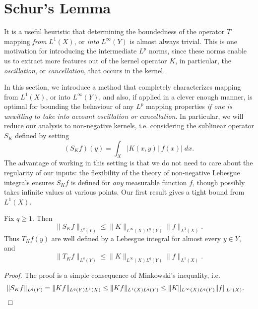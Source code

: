 \section{Schur's Lemma}

It is a useful heuristic that determining the boundedness of the operator $T$ mapping \emph{from} $L^1(X)$, or \emph{into} $L^\infty(Y)$ is almost always trivial. This is one motivation for introducing the intermediate $L^p$ norms, since these norms enable us to extract more features out of the kernel operator $K$, in particular, the \emph{oscillation}, or \emph{cancellation}, that occurs in the kernel.

In this section, we introduce a method that completely characterizes mapping from $L^1(X)$, or into $L^\infty(Y)$, and also, if applied in a clever enough manner, is optimal for bounding the behaviour of any $L^p$ mapping properties \emph{if one is unwilling to take into account oscillation or cancellation}. In particular, we will reduce our analysis to non-negative kernels, i.e. considering the sublinear operator $S_K$ defined by setting
%
\[ (S_K f)(y) = \int_X |K(x,y)| |f(x)|\; dx. \]
%
The advantage of working in this setting is that we do not need to care about the regularity of our inputs: the flexibility of the theory of non-negative Lebesgue integrals ensures $S_K f$ is defined for \emph{any} measurable function $f$, though possibly takes infinite values at various points. Our first result gives a tight bound from $L^1(X)$.

\begin{theorem}
  Fix $q \geq 1$. Then
  \[ \| S_K f \|_{L^q(Y)} \leq \| K \|_{L^\infty(X) L^q(Y)} \| f \|_{L^1(X)}. \]
  Thus $T_K f(y)$ are well defined by a Lebesgue integral for almost every $y \in Y$, and
  \[ \| T_K f \|_{L^q(Y)} \leq \| K \|_{L^\infty(X) L^q(Y)} \| f \|_{L^1(X)}. \]
\end{theorem}
\begin{proof}
  The proof is a simple consequence of Minkowski's inequality, i.e.
  \begin{align*}
    \| S_K f \|_{L^q(Y)} &= \| K f \|_{L^q(Y) L^1(X)} \leq \| Kf \|_{L^1(X) L^q(Y)} \leq \| K \|_{L^\infty(X) L^q(Y)} \| f \|_{L^1(X)}. \qedhere
  \end{align*}
\end{proof}

